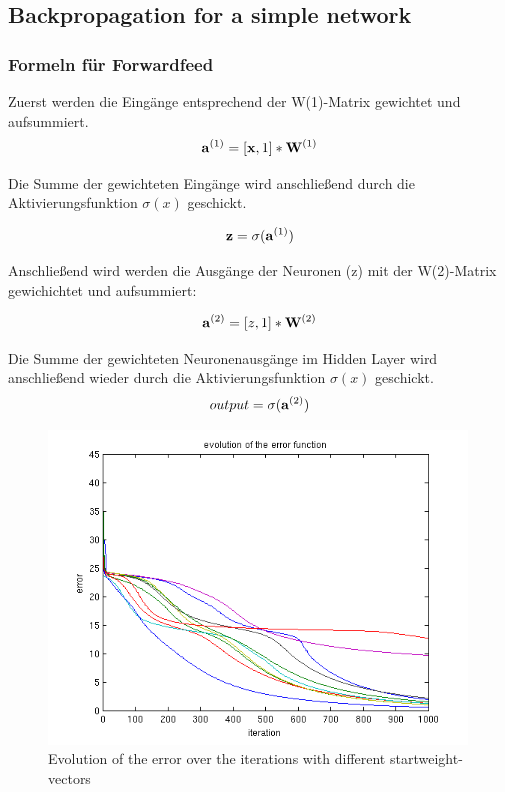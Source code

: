 \subsection{Backpropagation for a simple network}

\subsubsection{Formeln für Forwardfeed}

Zuerst werden die Eingänge entsprechend der W(1)-Matrix gewichtet und aufsummiert.
\begin{equation}
\mathbf{a}^{(1)} = [\mathbf{x},1] * \mathbf{W}^{(1)}
\end{equation}

Die Summe der gewichteten Eingänge wird anschließend durch die Aktivierungsfunktion $\sigma(x)$ geschickt.

\begin{equation}
\mathbf{z} = \sigma(\mathbf{a}^{(1)})
\end{equation}

Anschließend wird werden die Ausgänge der Neuronen (z) mit der W(2)-Matrix gewichichtet und aufsummiert:

\begin{equation}
 \mathbf{a}^{(2)} = [z,1] * \mathbf{W}^{(2)}
\end{equation}

Die Summe der gewichteten Neuronenausgänge im Hidden Layer wird anschließend wieder durch die Aktivierungsfunktion $\sigma(x)$ geschickt.
\begin{equation}
 output = \sigma(\mathbf{a}^{(2)})
\end{equation}




\begin{figure}[hp!]
\begin{center}
 \includegraphics[width=0.99\textwidth]{./figures/1/error}
 \caption{Evolution of the error over the iterations with different startweight-vectors}
\label{fig:backprop_error}
\end{center}
\end{figure}



